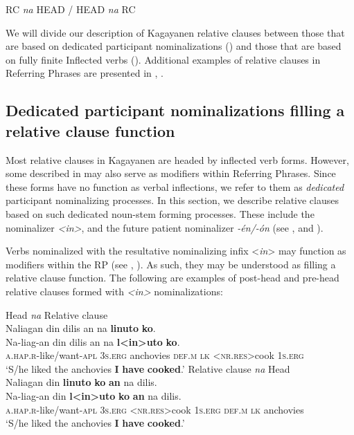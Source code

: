 \ea
\label{bkm:Ref474761906}
RC \textit{na} HEAD / HEAD \textit{na} RC
\z

We will divide our description of Kagayanen relative clauses between those that are based on dedicated participant nominalizations () and those that are based on fully finite Inflected verbs (). Additional examples of relative clauses in Referring Phrases are presented in , .

\subsection{Dedicated participant nominalizations filling a relative clause function}
\label{bkm:Ref115159779}
Most relative clauses in Kagayanen are headed by inflected verb forms. However, some  described in  may also serve as modifiers within Referring Phrases. Since these forms have no function as verbal inflections, we refer to them as \textit{dedicated} participant nominalizing processes. In this section, we describe relative clauses based on such dedicated noun-stem forming processes. These include the  nominalizer \textit{<in>}, and the future patient nominalizer \textit{{}-én/-ón} (see ,  and ).

Verbs nominalized with the resultative nominalizing infix <\textit{in}> may function as modifiers within the RP (see , ). As such, they may be understood as filling a relative clause function. The following are examples of post-head  and pre-head  relative clauses formed with \textit{<in>} nominalizations:

\ea
\label{bkm:Ref474824085}
Head  \textit{na}  Relative clause   \\
Naliagan  din  dilis  an  na  \textbf{linuto}  \textbf{ko}. \smallskip\\
\gll Na-liag-an  din  dilis  an  na  \textbf{l<in>uto}  \textbf{ko}. \\
\textsc{a.hap.r}-like/want-\textsc{apl}  3\textsc{s.erg}  anchovies \textsc{def.m}  \textsc{lk} <\textsc{nr.res}>cook  1\textsc{s.erg}   \\
\glt ‘S/he liked the anchovies \textbf{I} \textbf{have} \textbf{cooked}.’
\z
\ea
\label{bkm:Ref474824092}
Relative clause         \textit{na}  Head   \\
Naliagan  din  \textbf{linuto}  \textbf{ko}  \textbf{an}  na  dilis. \smallskip\\
\gll Na-liag-an  din  \textbf{l<in>uto}  \textbf{ko}  \textbf{an}  na  dilis. \\
\textsc{a.hap.r}-like/want-\textsc{apl}  3\textsc{s.erg}  <\textsc{nr.res}>cook  1\textsc{s.erg}  \textsc{def.m}  \textsc{lk}  anchovies \\
\glt ‘S/he liked the anchovies \textbf{I} \textbf{have} \textbf{cooked}.’
\z

